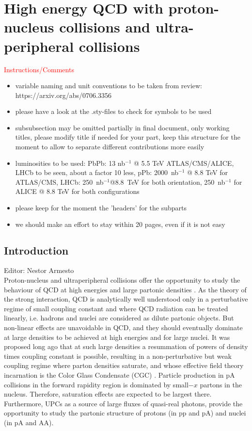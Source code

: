 \documentclass[../report.tex]{subfiles}
\begin{document}
\section{High energy QCD with proton-nucleus collisions and ultra-peripheral collisions}

\textcolor{red}{Instructions/Comments}
\begin{itemize}
\item variable naming and unit conventions to be taken from review: https://arxiv.org/abs/0706.3356
\item please have a look at the .sty-files to check for symbols to be used
\item subsubsection may be omitted partially in final document, only working titles, please modify title if needed for your part, keep this structure for the moment to allow to separate different contributions more easily
\item luminosities to be used: PbPb: 13 nb$^{-1}$ @ 5.5 TeV ATLAS/CMS/ALICE, LHCb to be seen, about a factor 10 less,
pPb: 2000~nb$^{-1}$ @ 8.8 TeV for ATLAS/CMS, LHCb: 250~nb$^{-1}$@8.8~TeV for both orientation, 250~nb$^{-1}$ for ALICE @ 8.8 TeV for both configurations
\item please keep for the moment the 'headers' for the subparts
\item we should make an effort to stay within 20 pages, even if it is not easy
\end{itemize}

\subsection{Introduction}
\label{sec:smallxIntro}
Editor: Nestor Armesto \\

Proton-nucleus \cite{Salgado:2011wc} and ultraperipheral \cite{Baltz:2007kq} collisions offer the opportunity to study the behaviour of QCD at high energies and large partonic densities \cite{Kovchegov:2012mbw}. As the theory of the strong interaction, QCD is analytically well understood only in a perturbative regime of small coupling constant and where QCD radiation can be treated linearly, i.e. hadrons and nuclei are considered as dilute partonic objects. But non-linear effects are unavoidable in QCD, and they should eventually dominate at large densities to be achieved at high energies and for large nuclei. It was proposed long ago \cite{Gribov:1984tu,Mueller:1985wy} that at such large densities a resummation of powers of density times coupling constant is possible, resulting in a non-perturbative but weak coupling regime where parton densities saturate, and whose effective field theory incarnation is the Color Glass Condensate (CGC) \cite{Gelis:2010nm}. Particle production in pA collisions in the forward rapidity region is dominated by small$-x$ partons in the nucleus. Therefore, saturation effects are expected to be largest there. Furthermore, UPCs as a source of large fluxes of quasi-real photons, provide the opportunity to study the partonic structure of protons (in pp and pA) and nuclei (in pA and AA).
\end{document}
